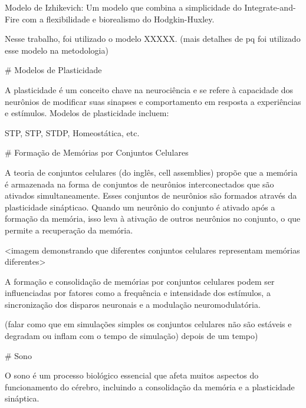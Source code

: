 Modelo de Izhikevich: Um modelo que combina a simplicidade
do Integrate-and-Fire com a flexibilidade e biorealismo do Hodgkin-Huxley.

Nesse trabalho, foi utilizado o modelo XXXXX. (mais detalhes de pq foi utilizado esse modelo na metodologia)

# Modelos de Plasticidade

A plasticidade é um conceito chave na neurociência e se refere à capacidade dos neurônios de modificar suas sinapses e
comportamento em resposta a experiências e estímulos. Modelos de plasticidade incluem:

STP, STP, STDP, Homeostática, etc.

# Formação de Memórias por Conjuntos Celulares
 
A teoria de conjuntos celulares (do inglês, cell assemblies) propõe que a memória é armazenada na forma de conjuntos de neurônios
interconectados que são ativados simultaneamente. Esses conjuntos de neurônios são formados através da plasticidade sinápticao.
Quando um neurônio do conjunto é ativado após a formação da memória, isso leva à ativação de outros neurônios no conjunto, o que
permite a recuperação da memória.

<imagem demonstrando que diferentes conjuntos celulares representam memórias diferentes>

A formação e consolidação de memórias por conjuntos celulares podem ser influenciadas por fatores como a frequência e intensidade
dos estímulos, a sincronização dos disparos neuronais e a modulação neuromodulatória.

(falar como que em simulações simples os conjuntos celulares não são estáveis e degradam ou inflam com o tempo de simulação)
depois de um tempo)

# Sono

O sono é um processo biológico essencial que afeta muitos aspectos do funcionamento do cérebro, incluindo a consolidação da
memória e a plasticidade sináptica.